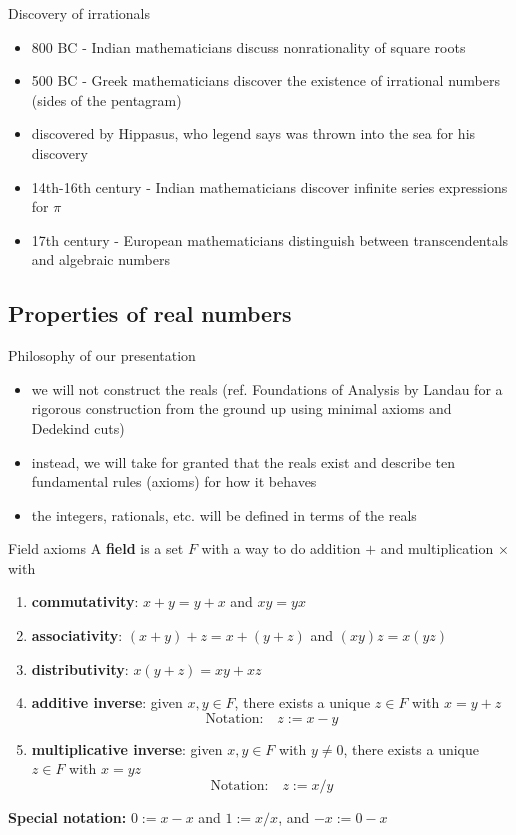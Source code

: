 \documentclass{beamer}
\begin{document}
\begin{frame}{Discovery of irrationals}
\begin{itemize}
\pause
\item 800 BC - Indian mathematicians discuss nonrationality of square roots
\pause
\item 500 BC - Greek mathematicians discover the existence of irrational numbers (sides of the pentagram)
\pause
\item discovered by Hippasus, who legend says was thrown into the sea for his discovery
\pause
\item 14th-16th century - Indian mathematicians discover infinite series expressions for $\pi$
\pause
\item 17th century - European mathematicians distinguish between transcendentals and algebraic numbers
\end{itemize}
\end{frame}

\subsection{Properties of real numbers}

\begin{frame}{Philosophy of our presentation}
\begin{itemize}
\pause
\item we will not construct the reals (ref. Foundations of Analysis by Landau for a rigorous construction from the ground up using minimal axioms and Dedekind cuts)
\pause
\item instead, we will take for granted that the reals exist and describe ten fundamental rules (axioms) for how it behaves
\pause
\item the integers, rationals, etc. will be defined in terms of the reals
\end{itemize}
\end{frame}


\begin{frame}{Field axioms}
A \textbf{field} is a set $F$ with a way to do addition $+$ and multiplication $\times$ with
\begin{enumerate}[\text{A}1]
\pause
\item \textbf{commutativity}: $x+y = y+x$ and $xy=yx$
\pause
\item \textbf{associativity}: $(x+y) + z = x + (y+z)$ and $(xy)z = x(yz)$
\pause
\item \textbf{distributivity}: $x(y + z) = xy + xz$
\pause
\item \textbf{additive inverse}: given $x,y\in F$, there exists a unique $z\in F$ with $x=y+z$
$$\text{Notation:}\quad z := x-y$$
\pause
\item \textbf{multiplicative inverse}: given $x,y\in F$ with $y\neq 0$, there exists a unique $z\in F$ with $x = yz$
$$\text{Notation:}\quad z := x/y$$
\end{enumerate}
\pause
\textbf{Special notation:} $0:= x-x$ and $1:= x/x$, and $-x := 0-x$
\end{frame}
\end{document}

